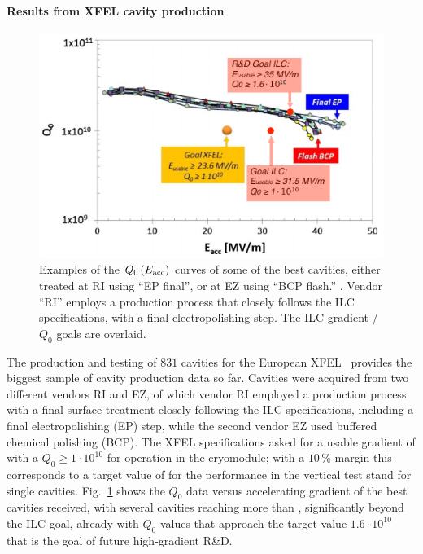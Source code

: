 \paragraph{Results from XFEL cavity production}

\begin{figure}[htbp]
   \includegraphics[width=\hsize]{chapters/figures/prab-19-092001-fig19-mod}
\caption{Examples of the $Q_0\,(E_{\mathrm{acc}})$ curves of some of the best
cavities, either treated at RI using ``EP final'', or at EZ using
``BCP flash.''
\cite[Fig. 19]{Singer:2016fbf}. 
Vendor ``RI'' employs a production process that closely follows the ILC specifications, with a final electropolishing step.
The ILC gradient / $Q_0$ goals are overlaid.}
\label{fig:cavity-gradient}
\end{figure}

The production and testing of $831$ cavities for the European XFEL~\cite{Singer:2016fbf,Reschke:2017gjp} provides the biggest sample of cavity production data so far. 
Cavities were acquired from two different vendors RI and EZ,
of which vendor RI employed a production process with a final surface treatment closely following the ILC specifications, including a final electropolishing (EP) step,
while the second vendor EZ used buffered chemical polishing (BCP).
The XFEL specifications asked for a usable gradient of  with a $Q_0 \ge 1  \cdot 10^{10}$ for operation in the cryomodule;
with a $10\,\%$ margin this corresponds to a target value of  for the performance in the vertical test stand for single cavities.
Fig.~\ref{fig:cavity-gradient} shows the $Q_0$ data versus accelerating gradient of the best cavities received, with several cavities reaching more than , significantly beyond the ILC goal, already with $Q_0$ values that approach the target value $1.6\cdot10^{10}$ that is the goal of future high-gradient R\&D.

